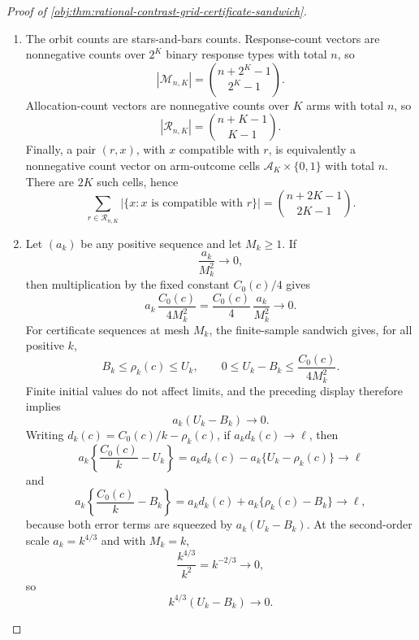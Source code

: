 \documentclass[11pt]{article}
\begin{document}
\begin{proof}[Proof of \cref{obj:thm:rational-contrast-grid-certificate-sandwich}]
\begin{enumerate}
\item The orbit counts are stars-and-bars counts.  Response-count vectors are nonnegative counts over \(2^K\) binary response types with total \(n\), so
\[
|\mathcal M_{n,K}|=\binom{n+2^K-1}{2^K-1}.
\]
Allocation-count vectors are nonnegative counts over \(K\) arms with total \(n\), so
\[
|\mathcal R_{n,K}|=\binom{n+K-1}{K-1}.
\]
Finally, a pair \((r,x)\), with \(x\) compatible with \(r\), is equivalently a nonnegative count vector on arm-outcome cells \(\mathcal A_K\times\{0,1\}\) with total \(n\).  There are \(2K\) such cells, hence
\[
\sum_{r\in\mathcal R_{n,K}}|\{x:x\text{ is compatible with }r\}|
=
\binom{n+2K-1}{2K-1}.
\]

\item Let \((a_k)\) be any positive sequence and let \(M_k\geq1\).  If
\[
\frac{a_k}{M_k^2}\longrightarrow0,
\]
then multiplication by the fixed constant \(C_0(c)/4\) gives
\[
a_k\,\frac{C_0(c)}{4M_k^2}
=
\frac{C_0(c)}{4}\,\frac{a_k}{M_k^2}
\longrightarrow0.
\]
For certificate sequences at mesh \(M_k\), the finite-sample sandwich gives, for all positive \(k\),
\[
B_k\leq\rho_k(c)\leq U_k,
\qquad
0\leq U_k-B_k\leq \frac{C_0(c)}{4M_k^2}.
\]
Finite initial values do not affect limits, and the preceding display therefore implies
\[
a_k(U_k-B_k)\longrightarrow0.
\]
Writing \(d_k(c)=C_0(c)/k-\rho_k(c)\), if \(a_kd_k(c)\to\ell\), then
\[
a_k\left\{\frac{C_0(c)}{k}-U_k\right\}
=
a_kd_k(c)-a_k\{U_k-\rho_k(c)\}
\longrightarrow\ell
\]
and
\[
a_k\left\{\frac{C_0(c)}{k}-B_k\right\}
=
a_kd_k(c)+a_k\{\rho_k(c)-B_k\}
\longrightarrow\ell,
\]
because both error terms are squeezed by \(a_k(U_k-B_k)\).  At the second-order scale \(a_k=k^{4/3}\) and with \(M_k=k\),
\[
\frac{k^{4/3}}{k^2}=k^{-2/3}\longrightarrow0,
\]
so
\[
k^{4/3}(U_k-B_k)\longrightarrow0.
\]
\end{enumerate}
\end{proof}
\end{document}
